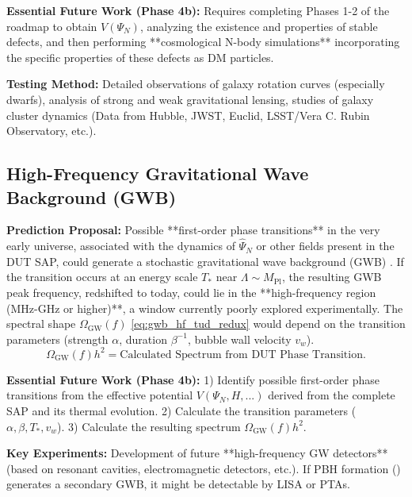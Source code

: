 \documentclass[11pt, a4paper]{article}
\theoremstyle{remark}
\newcommand{\Op}[1]{\hat{#1}}
\newcommand{\Mpl}{M_{\mathrm{Pl}}}
\begin{document}
\textbf{Essential Future Work (Phase 4b):}
Requires completing Phases 1-2 of the roadmap to obtain \( V(\Psi_N) \), analyzing the existence and properties of stable defects, and then performing **cosmological N-body simulations** incorporating the specific properties of these defects as DM particles.

\textbf{Testing Method:}
Detailed observations of galaxy rotation curves (especially dwarfs), analysis of strong and weak gravitational lensing, studies of galaxy cluster dynamics (Data from Hubble, JWST, Euclid, LSST/Vera C. Rubin Observatory, etc.).

\subsection{High-Frequency Gravitational Wave Background (GWB)}
\label{subsec:gwb_high_freq_final_revised}

\textbf{Prediction Proposal:}
Possible **first-order phase transitions** in the very early universe, associated with the dynamics of \( \Op{\Psi}_N \) or other fields present in the DUT SAP, could generate a stochastic gravitational wave background (GWB) \citep{Witten:1984rs, Hogan:1986qda}. If the transition occurs at an energy scale \( T_* \) near \( \Lambda \sim \Mpl \), the resulting GWB peak frequency, redshifted to today, could lie in the **high-frequency region (MHz-GHz or higher)**, a window currently poorly explored experimentally. The spectral shape \( \Omega_{\text{GW}}(f) \) \eqref{eq:gwb_hf_tud_redux} would depend on the transition parameters (strength \( \alpha \), duration \( \beta^{-1} \), bubble wall velocity \( v_w \)).
\begin{equation} \label{eq:gwb_hf_tud_redux}
\Omega_{\text{GW}}(f)h^2 = \text{Calculated Spectrum from DUT Phase Transition}.
\end{equation}

\textbf{Essential Future Work (Phase 4b):}
1) Identify possible first-order phase transitions from the effective potential \( V(\Psi_N, H, ...) \) derived from the complete SAP and its thermal evolution. 2) Calculate the transition parameters (\( \alpha, \beta, T_*, v_w \)). 3) Calculate the resulting spectrum \( \Omega_{\text{GW}}(f)h^2 \).

\textbf{Key Experiments:}
Development of future **high-frequency GW detectors** (based on resonant cavities, electromagnetic detectors, etc.). If PBH formation () generates a secondary GWB, it might be detectable by LISA or PTAs.
\end{document}
